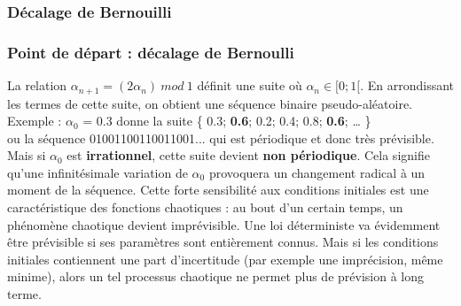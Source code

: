 \documentclass{beamer}
\begin{document}
\subsubsection{Décalage de Bernouilli}
\begin{frame}
\frametitle{Point de départ : décalage de Bernoulli}

La relation $\alpha_{n+1}=(2\alpha_n)\ mod\ 1$  définit une suite où $\alpha_n \in [0;1[$. En arrondissant les termes de cette suite, on obtient une séquence binaire pseudo-aléatoire. \\
Exemple : $\alpha_0$ = 0.3 donne la suite \{ 0.3; \textbf{0.6}; 0.2; 0.4; 0.8; \textbf{0.6}; … \} \\
ou la séquence 01001100110011001... qui est périodique et donc très prévisible. \\
Mais si $\alpha_0$ est \textbf{irrationnel}, cette suite devient \textbf{non périodique}. Cela signifie qu’une infinitésimale variation de $\alpha_0$ provoquera un changement radical à un moment de la séquence. Cette forte sensibilité aux conditions initiales est une caractéristique des fonctions chaotiques : au bout d'un certain temps, un phénomène chaotique devient imprévisible.
Une loi déterministe va évidemment être prévisible si ses paramètres sont entièrement connus. Mais si les conditions initiales contiennent une part d’incertitude (par exemple une imprécision, même minime), alors un tel processus chaotique ne permet plus de prévision à long terme.
\end{frame}
\end{document}
